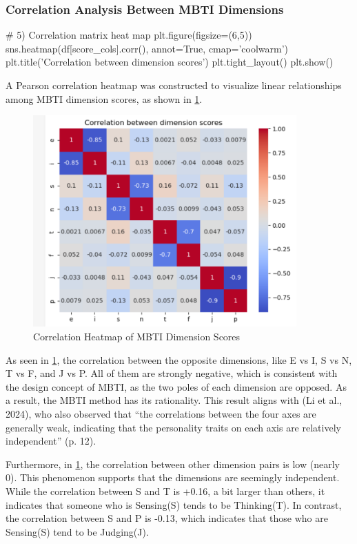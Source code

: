 \documentclass[12pt]{article}
\numberwithin{figure}{section}  %
\begin{document}
\subsubsection{Correlation Analysis Between MBTI Dimensions}
	\begin{python}
# 5) Correlation matrix heat map
plt.figure(figsize=(6,5))
sns.heatmap(df[score_cols].corr(), annot=True, cmap='coolwarm')
plt.title('Correlation between dimension scores')
plt.tight_layout()
plt.show()
	\end{python}
	A Pearson correlation heatmap was constructed to visualize linear
	relationships among MBTI dimension scores, as shown in \cref{personheatmap}.
	\begin{figure}[H]
		\centering
		\includegraphics[width=0.9\textwidth]{Q1EDA9} 
		\caption{Correlation Heatmap of MBTI Dimension Scores}	
		\label{personheatmap}	
	\end{figure}
	
	As seen in \cref{personheatmap}, the correlation between the opposite
	dimensions, like E vs I, S vs N, T vs F, and J vs P. All of them are
	strongly negative, which is consistent with the design concept of MBTI, as
	the two poles of each dimension are opposed. As a result, the MBTI method
	has its rationality. This result aligns with (Li et al., 2024), who also %
	observed that “the correlations between the four axes are generally weak,
	indicating that the personality traits on each axis are relatively
	independent” (p. 12).%
	
	Furthermore, in \cref{personheatmap}, the correlation between other dimension pairs
	is low (nearly 0). This phenomenon supports that the dimensions are
	seemingly independent. While the correlation between S and T is +0.16, a bit
	larger than others, it indicates that someone who is Sensing(S) tends to be
	Thinking(T). In contrast, the correlation between S and P is -0.13, which
	indicates that those who are Sensing(S) tend to be Judging(J).
\end{document}
